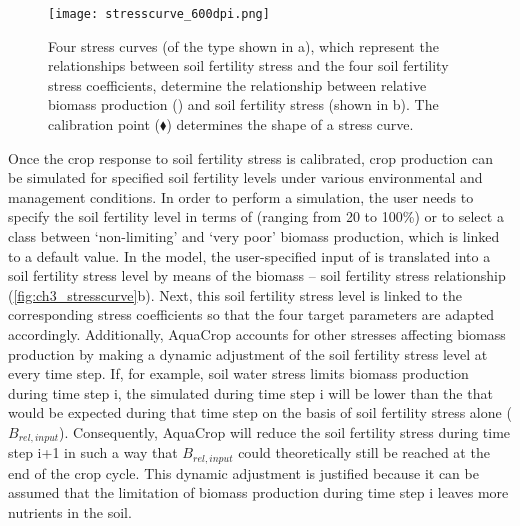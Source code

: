 \begin{figure}[tbhp]
	\centering
		\texttt{[image: stresscurve\_600dpi.png]}
	\caption{Four stress curves (of the type shown in a), which represent the relationships between soil fertility stress and the four soil fertility stress coefficients, determine the relationship between relative biomass production (\Brel) and soil fertility stress (shown in b). The calibration point ($\blacklozenge$) determines the shape of a stress curve.}
	\label{fig:ch3_stresscurve}
\end{figure}

Once the crop response to soil fertility stress is calibrated, crop production can be simulated for specified soil fertility levels under various environmental and management conditions. In order to perform a simulation, the user needs to specify the soil fertility level in terms of \Brel (ranging from 20 to 100\%) or to select a class between `non-limiting' and `very poor' biomass production, which is linked to a default \Brel value. In the model, the user-specified input of \Brel is translated into a soil fertility stress level by means of the biomass – soil fertility stress relationship (\autoref{fig:ch3_stresscurve}b). Next, this soil fertility stress level is linked to the corresponding stress coefficients so that the four target parameters are adapted accordingly. Additionally, AquaCrop accounts for other stresses affecting biomass production by making a dynamic adjustment of the soil fertility stress level at every time step. If, for example, soil water stress limits biomass production during time step i, the simulated \Brel during time step i will be lower than the \Brel that would be expected during that time step on the basis of soil fertility stress alone ($B_{rel,input}$). Consequently, AquaCrop will reduce the soil fertility stress during time step i+1 in such a way that $B_{rel,input}$ could theoretically still be reached at the end of the crop cycle. This dynamic adjustment is justified because it can be assumed that the limitation of biomass production during time step i leaves more nutrients in the soil.

